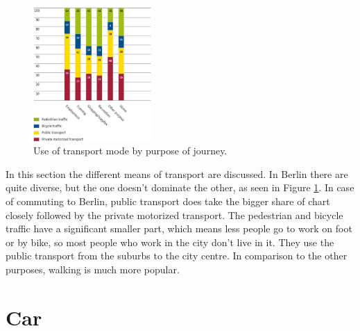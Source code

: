 \begin{figure}
	\includegraphics[width=0.4\textwidth]{MobilityInTheCityJPG/Graphs/UseOfTransportPurpose.jpg}
	\centering
	\caption{Use of transport mode by purpose of journey.\cite{MobilityCity}}
	\label{comparison}
\end{figure}
In this section the different means of transport are discussed. In Berlin there are quite diverse, but the one doesn't dominate the other, as seen in Figure \ref{comparison}. In case of commuting to Berlin, public transport does take the bigger share of chart closely followed by the private motorized transport. The pedestrian and bicycle traffic have a significant smaller part, which means less people go to work on foot or by bike, so most people who work in the city don't live in it. They use the public transport from the suburbs to the city centre. In comparison to the other purposes, walking is much more popular.

\section{Car}

